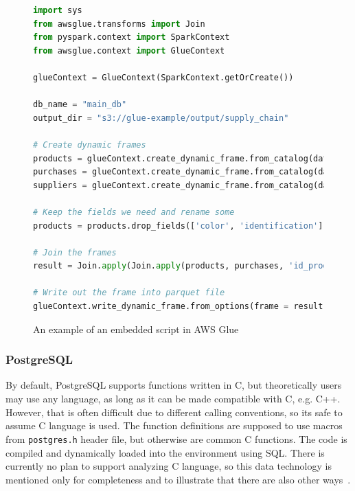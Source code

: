 \begin{figure}[ht]
\begin{lstlisting}[language=Python]
import sys
from awsglue.transforms import Join
from pyspark.context import SparkContext
from awsglue.context import GlueContext

glueContext = GlueContext(SparkContext.getOrCreate())

db_name = "main_db"
output_dir = "s3://glue-example/output/supply_chain"

# Create dynamic frames
products = glueContext.create_dynamic_frame.from_catalog(database=db_name, table_name="products_json")
purchases = glueContext.create_dynamic_frame.from_catalog(database=db_name, table_name="purchases_json")
suppliers = glueContext.create_dynamic_frame.from_catalog(database=db_name, table_name="suppliers_json")

# Keep the fields we need and rename some
products = products.drop_fields(['color', 'identification']).rename_field('name', 'product_name')

# Join the frames
result = Join.apply(Join.apply(products, purchases, 'id_product', 'product_id'), suppliers, 'supplier_id', 'id_supplier')

# Write out the frame into parquet file
glueContext.write_dynamic_frame.from_options(frame = result, connection_type = "s3", connection_options = {"path": output_dir}, format = "parquet")
\end{lstlisting}
\caption{An example of an embedded script in AWS Glue}
\label{fig:embeddedScript}
\end{figure}

\subsubsection{PostgreSQL}
By default, PostgreSQL supports functions written in C, but theoretically users may use any language, as long as it can be made compatible with C, e.g. C++. However, that is often difficult due to different calling conventions, so its safe to assume C language is used. The function definitions are supposed to use macros from \texttt{postgres.h} header file, but otherwise are common C functions. The code is compiled and dynamically loaded into the environment using SQL. There is currently no plan to support analyzing C language, so this data technology is mentioned only for completeness and to illustrate that there are also other ways~\cite{postgresql}.

